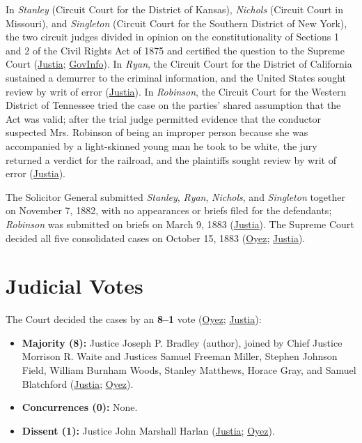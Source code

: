 \documentclass[12pt]{article}
\begin{document}
In \textit{Stanley} (Circuit Court for the District of Kansas), \textit{Nichols} (Circuit Court in Missouri), and \textit{Singleton} (Circuit Court for the Southern District of New York), the two circuit judges divided in opinion on the constitutionality of Sections 1 and 2 of the Civil Rights Act of 1875 and certified the question to the Supreme Court (\href{https://supreme.justia.com/cases/federal/us/109/3/}{Justia}; \href{https://www.govinfo.gov/content/pkg/USREPORTS-109/pdf/USREPORTS-109-3.pdf}{GovInfo}). In \textit{Ryan}, the Circuit Court for the District of California sustained a demurrer to the criminal information, and the United States sought review by writ of error (\href{https://supreme.justia.com/cases/federal/us/109/3/}{Justia}). In \textit{Robinson}, the Circuit Court for the Western District of Tennessee tried the case on the parties' shared assumption that the Act was valid; after the trial judge permitted evidence that the conductor suspected Mrs. Robinson of being an improper person because she was accompanied by a light-skinned young man he took to be white, the jury returned a verdict for the railroad, and the plaintiffs sought review by writ of error (\href{https://supreme.justia.com/cases/federal/us/109/3/}{Justia}).

The Solicitor General submitted \textit{Stanley}, \textit{Ryan}, \textit{Nichols}, and \textit{Singleton} together on November 7, 1882, with no appearances or briefs filed for the defendants; \textit{Robinson} was submitted on briefs on March 9, 1883 (\href{https://supreme.justia.com/cases/federal/us/109/3/}{Justia}). The Supreme Court decided all five consolidated cases on October 15, 1883 (\href{https://www.oyez.org/cases/1850-1900/109us3}{Oyez}; \href{https://supreme.justia.com/cases/federal/us/109/3/}{Justia}).

\section{Judicial Votes}

The Court decided the cases by an \textbf{8--1} vote (\href{https://www.oyez.org/cases/1850-1900/109us3}{Oyez}; \href{https://supreme.justia.com/cases/federal/us/109/3/}{Justia}):
\begin{itemize}
\item \textbf{Majority (8):} Justice Joseph P. Bradley (author), joined by Chief Justice Morrison R. Waite and Justices Samuel Freeman Miller, Stephen Johnson Field, William Burnham Woods, Stanley Matthews, Horace Gray, and Samuel Blatchford (\href{https://supreme.justia.com/cases/federal/us/109/3/}{Justia}; \href{https://www.oyez.org/cases/1850-1900/109us3}{Oyez}).
\item \textbf{Concurrences (0):} None.
\item \textbf{Dissent (1):} Justice John Marshall Harlan (\href{https://supreme.justia.com/cases/federal/us/109/3/}{Justia}; \href{https://www.oyez.org/cases/1850-1900/109us3}{Oyez}).
\end{itemize}
\end{document}
